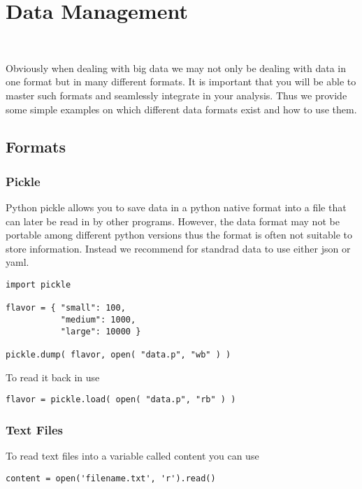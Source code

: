 \chapter{Data Management}

\FILENAME\

Obviously when dealing with big data we may not only be dealing with
data in one format but in many different formats. It is important that
you will be able to master such formats and seamlessly integrate in
your analysis. Thus we provide some simple examples on which different
data formats exist and how to use them.

\section{Formats}

\subsection{Pickle}

Python pickle allows you to save data in a python native format into a file
that can later be read in by other programs. However, the data format
may not be portable among different python versions thus the format is
often not suitable to store information. Instead we recommend for
standrad data to use either json or yaml.

\begin{verbatim}
import pickle

flavor = { "small": 100, 
           "medium": 1000,
           "large": 10000 }

pickle.dump( flavor, open( "data.p", "wb" ) )

\end{verbatim}

To read it back in use

\begin{verbatim}
flavor = pickle.load( open( "data.p", "rb" ) )
\end{verbatim}

\subsection{Text Files}

To read text files into a variable called content  you can use 

\begin{verbatim}
content = open('filename.txt', 'r').read() 
\end{verbatim}


